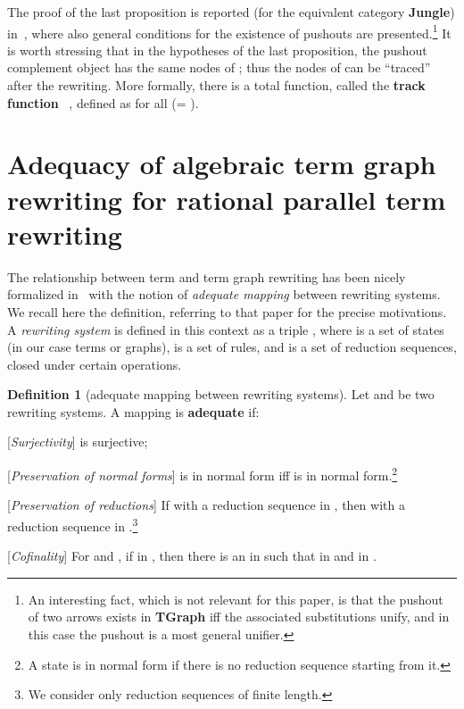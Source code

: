 \documentclass{eptcs}
\theoremstyle{plain}
\theoremstyle{definition}
\newtheorem{definition}[theorem]{Definition}
\begin{document}
The proof of the last proposition is reported (for the equivalent 
category  {\bf Jungle}) in~\cite{CR:HRJR}, where also general conditions 
for the existence of pushouts are presented.\footnote{An interesting 
fact, which is not relevant for this paper, is that the pushout of two 
arrows exists in {\bf TGraph} iff the associated 
substitutions 
unify, and in this case the pushout is a most general unifier.} 
It is worth stressing that in the hypotheses of the last proposition,
the pushout 
complement object  has the same nodes of ; thus the nodes of  
can be ``traced'' after the rewriting. More formally, there is a total 
function, called the {\bf track function\/}~\cite{HP:ITRJ} ,  
defined as  for all  (= ). 


\section{Adequacy of algebraic term graph rewriting for rational 
parallel term rewriting}
\label{se:adequacy}

The relationship between term and term graph rewriting has been nicely 
formalized in~\cite{KKSV:AGRS} with the notion of {\em adequate mapping} 
between rewriting systems. We recall here the definition, referring to 
that paper for the precise motivations. A {\em rewriting system} is 
defined in this context as a triple , where  is a set of 
states (in our case terms or graphs),  is a set of rules, and  
is a set of reduction sequences, closed under certain operations.   

\begin{definition} 
[adequate mapping between rewriting systems]
\label{de:adequate mapping}
Let    and  be two rewriting systems. 
A mapping  is {\bf adequate} if:

\begin{description}
\item {[{\em Surjectivity}]}  is surjective;
\item {[{\em Preservation of normal forms}]}  is in normal 
form iff  is in normal form.\footnote{A state is 
in 
normal form if there is no reduction sequence starting from it.}

\item {[{\em Preservation of reductions}]} If  
with a reduction sequence in , then  with a reduction sequence in .\footnote{We consider 
only reduction sequences of finite length.} 

\item {[{\em Cofinality}]} For  and , if  in , then there is an  in  such 
that  in  and  
in .
\end{description}
\end{definition}
\end{document}
